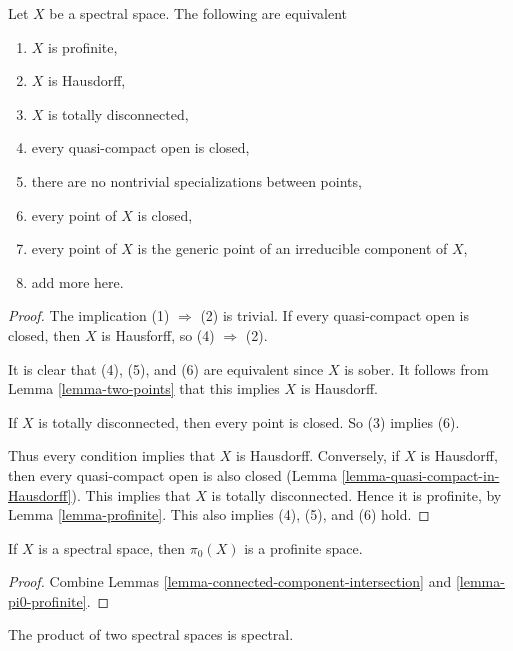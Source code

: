 \begin{lemma}
\label{lemma-characterize-profinite-spectral}
Let $X$ be a spectral space. The following are equivalent
\begin{enumerate}
\item $X$ is profinite,
\item $X$ is Hausdorff,
\item $X$ is totally disconnected,
\item every quasi-compact open is closed,
\item there are no nontrivial specializations between points,
\item every point of $X$ is closed,
\item every point of $X$ is the generic point of an irreducible component
of $X$,
\item add more here.
\end{enumerate}
\end{lemma}

\begin{proof}
The implication (1) $\Rightarrow$ (2) is trivial.
If every quasi-compact open is closed, then $X$ is Hausforff, so
(4) $\Rightarrow$ (2).

\medskip\noindent
It is clear that (4), (5), and (6) are equivalent since $X$ is sober.
It follows from Lemma \ref{lemma-two-points} that this implies $X$ is
Hausdorff.

\medskip\noindent
If $X$ is totally disconnected, then every point is closed.
So (3) implies (6).

\medskip\noindent
Thus every condition implies that $X$ is Hausdorff. Conversely, if $X$
is Hausdorff, then every quasi-compact open is also closed
(Lemma \ref{lemma-quasi-compact-in-Hausdorff}). This implies that $X$
is totally disconnected. Hence it is profinite, by
Lemma \ref{lemma-profinite}.
This also implies (4), (5), and (6) hold.
\end{proof}

\begin{lemma}
\label{lemma-spectral-pi0}
If $X$ is a spectral space, then $\pi_0(X)$ is a profinite space.
\end{lemma}

\begin{proof}
Combine Lemmas \ref{lemma-connected-component-intersection} and
\ref{lemma-pi0-profinite}.
\end{proof}

\begin{lemma}
\label{lemma-product-spectral-spaces}
The product of two spectral spaces is spectral.
\end{lemma}

